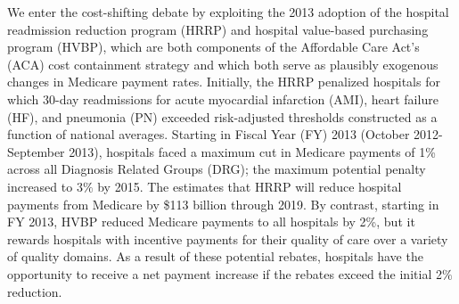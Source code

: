 \documentclass[12pt]{article}
\begin{document}
We enter the cost-shifting debate by exploiting the 2013 adoption of the hospital readmission reduction program (HRRP) and hospital value-based purchasing program (HVBP), which are both components of the Affordable Care Act's (ACA) cost containment strategy and which both serve as plausibly exogenous changes in Medicare payment rates.  Initially, the HRRP penalized hospitals for which 30-day readmissions for acute myocardial infarction (AMI), heart failure (HF), and pneumonia (PN) exceeded risk-adjusted thresholds constructed as a function of national averages.  Starting in Fiscal Year (FY) 2013 (October 2012-September 2013), hospitals faced a maximum cut in Medicare payments of 1\% across all Diagnosis Related Groups (DRG); the maximum potential penalty increased to 3$\%$ by 2015.  The \cite{cbo2010} estimates that HRRP will reduce hospital payments from Medicare by \$113 billion through 2019.  By contrast, starting in FY 2013, HVBP reduced Medicare payments to all hospitals by 2\%, but it rewards hospitals with incentive payments for their quality of care over a variety of quality domains. As a result of these potential rebates, hospitals have the opportunity to receive a net payment increase if the rebates exceed the initial 2$\%$ reduction. 
\end{document}
